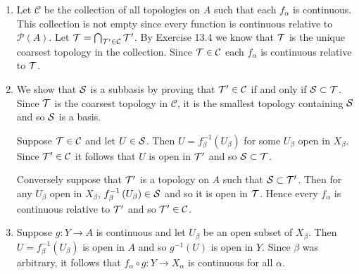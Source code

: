 \begin{sol}
    ${}$
    \begin{enumerate}
        \item Let $\mathcal{C}$ be the collection of all topologies on $A$ such that each $f_\alpha$ is continuous.
            This collection is not empty since every function is continuous relative to $\mathcal{P}(A)$. Let $\mathcal{T}=\bigcap_{\mathcal{T}'\in\mathcal{C}}\mathcal{T}'$.
            By Exercise 13.4 we know that $\mathcal{T}$ is the unique coarsest topology in the collection. Since $\mathcal{T}\in\mathcal{C}$ each $f_\alpha$ is continuous relative to $\mathcal{T}$.
        \item We show that $\mathcal{S}$ is a subbasis by proving that $\mathcal{T}'\in\mathcal{C}$ if and only if $\mathcal{S}\subset\mathcal{T}$. Since $\mathcal{T}$ is the coarsest topology in $\mathcal{C}$, it is the smallest topology containing $\mathcal{S}$ and so $\mathcal{S}$ is a basis.
        
        Suppose $\mathcal{T}\in\mathcal{C}$ and let $U\in\mathcal{S}$. Then $U=f^{-1}_\beta\left(U_\beta\right)$ for some $U_\beta$ open in $X_\beta$. Since $\mathcal{T}'\in\mathcal{C}$ it follows that $U$ is open in $\mathcal{T}'$ and so $\mathcal{S}\subset\mathcal{T}$.

        Conversely suppose that $\mathcal{T}'$ is a topology on $A$ such that $\mathcal{S}\subset\mathcal{T}'$. Then for any $U_\beta$ open in $X_\beta$, $f^{-1}_\beta\left(U_\beta\right)\in\mathcal{S}$ and so it is open in $\mathcal{T}$.
        Hence every $f_\alpha$ is continuous relative to $\mathcal{T}'$ and so $\mathcal{T}'\in\mathcal{C}$.
        \item Suppose $g:Y\to A$ is continuous and let $U_\beta$ be an open subset of $X_\beta$. 
        Then $U=f^{-1}_\beta\left(U_\beta\right)$ is open in $A$ and so $g^{-1}(U)$ is open in $Y$. 
        Since $\beta$ was arbitrary, it follows that $f_\alpha\circ g:Y\to X_\alpha$ is continuous for all $\alpha$.


\end{enumerate}
\end{sol}
